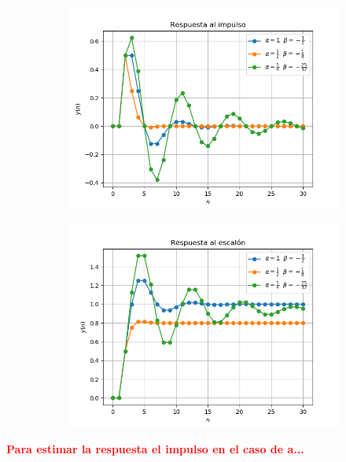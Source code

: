\begin{figure}[H]
\centering
\begin{subfigure}{.7\textwidth}
\centering
	\includegraphics[width=\textwidth]{Imagenes/9-impulso.png}
\end{subfigure}
\begin{subfigure}{.7\textwidth}
\centering
	\includegraphics[width=\textwidth]{Imagenes/9-escalon.png}
\end{subfigure}
\end{figure}

\begin{center}
	\textcolor{red}{\textbf{Para estimar la respuesta el impulso en el caso de a...}}
\end{center}



